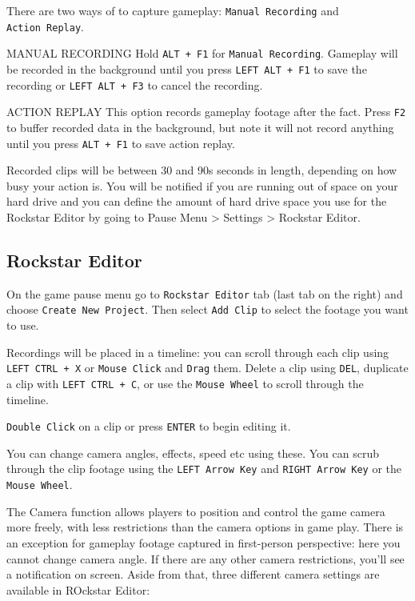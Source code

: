 \documentclass[
  openany]{book}
\begin{document}
There are two ways of to capture gameplay: \texttt{Manual\ Recording} and \texttt{Action\ Replay}.

MANUAL RECORDING
Hold \texttt{ALT\ +\ F1} for \texttt{Manual\ Recording}. Gameplay will be recorded in the background until you press \texttt{LEFT\ ALT\ +\ F1} to save the recording or \texttt{LEFT\ ALT\ +\ F3} to cancel the recording.

ACTION REPLAY
This option records gameplay footage after the fact. Press \texttt{F2} to buffer recorded data in the background, but note it will not record anything until you press \texttt{ALT\ +\ F1} to save action replay.

Recorded clips will be between 30 and 90s seconds in length, depending on how busy your action is. You will be notified if you are running out of space on your hard drive and you can define the amount of hard drive space you use for the Rockstar Editor by going to Pause Menu \textgreater{} Settings \textgreater{} Rockstar Editor.

\hypertarget{rockstar-editor}{%
\subsection*{Rockstar Editor}\label{rockstar-editor}}

On the game pause menu go to \texttt{Rockstar\ Editor} tab (last tab on the right) and choose \texttt{Create\ New\ Project}. Then select \texttt{Add\ Clip} to select the footage you want to use.

Recordings will be placed in a timeline: you can scroll through each clip using \texttt{LEFT\ CTRL\ +\ X} or \texttt{Mouse\ Click} and \texttt{Drag} them.
Delete a clip using \texttt{DEL}, duplicate a clip with \texttt{LEFT\ CTRL\ +\ C}, or use the \texttt{Mouse\ Wheel} to scroll through the timeline.

\texttt{Double\ Click} on a clip or press \texttt{ENTER} to begin editing it.

You can change camera angles, effects, speed etc using these. You can scrub through the clip footage using the \texttt{LEFT\ Arrow\ Key} and \texttt{RIGHT\ Arrow\ Key} or the \texttt{Mouse\ Wheel}.

The Camera function allows players to position and control the game camera more freely, with less restrictions than the camera options in game play. There is an exception for gameplay footage captured in first-person perspective: here you cannot change camera angle. If there are any other camera restrictions, you'll see a notification on screen. Aside from that, three different camera settings are available in ROckstar Editor:
\end{document}
